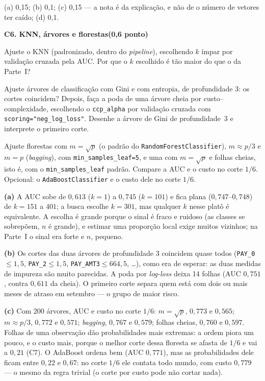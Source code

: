 \documentclass[11pt,a4paper]{article}
\newcommand{\tarefa}[3]{%
  \bigskip\par\noindent
  {\large\bfseries\color{azulufrj}#1. #2}\hfill{\bfseries(#3)}\par
  \nopagebreak\vspace{0.3em}}
\newcommand{\cod}[1]{\texttt{#1}}
\begin{document}
\begin{criterio}
(a) 0,15; (b) 0,1; (c) 0,15 --- a nota é da explicação, e não de o número de vetores
ter caído; (d) 0,1.
\end{criterio}

\tarefa{C6}{KNN, árvores e florestas}{0,6 ponto}

\begin{itens}
  \item Ajuste o KNN (padronizado, dentro do \emph{pipeline}), escolhendo $k$ ímpar por
        validação cruzada pela AUC. Por que o $k$ escolhido é tão maior do que o da
        Parte~I?
  \item Ajuste árvores de classificação com Gini e com entropia, de profundidade 3:
        os cortes coincidem? Depois, faça a poda de uma árvore cheia por
        custo--complexidade, escolhendo o \cod{ccp\_alpha} por validação cruzada com
        \cod{scoring="neg\_log\_loss"}. Desenhe a árvore de Gini de profundidade~3 e
        interprete o primeiro corte.
  \item Ajuste florestas com $m=\sqrt p$ (o padrão do \cod{RandomForestClassifier}),
        $m\approx p/3$ e $m=p$ (\emph{bagging}), com \cod{min\_samples\_leaf=5}, e uma
        com $m=\sqrt p$ e folhas cheias, isto é, com o \cod{min\_samples\_leaf} padrão.
        Compare a AUC e o custo no corte $1/6$. Opcional: o \cod{AdaBoostClassifier} e o custo dele no
        corte $1/6$.
\end{itens}

\begin{solucao}
\textbf{(a)} A AUC sobe de $0{,}613$ ($k=1$) a $0{,}745$ ($k=101$) e fica plana
($0{,}747$--$0{,}748$) de $k=151$ a $401$; a busca escolhe $k=301$, mas qualquer $k$
nesse platô é equivalente. A escolha é
grande porque o sinal é fraco e ruidoso (as classes se sobrepõem, $n$ é grande), e
estimar uma proporção local exige muitos vizinhos; na Parte~I o sinal era forte e
$n$, pequeno.

\textbf{(b)} Os cortes das duas árvores de profundidade 3 coincidem quase todos
(\cod{PAY\_0}$\le1{,}5$, \cod{PAY\_2}$\le1{,}5$, \cod{PAY\_AMT3}$\le664{,}5$, \dots), como era
de esperar: as duas medidas de impureza são muito parecidas. A poda por \emph{log-loss} deixa 14 folhas (AUC $0{,}751$, contra
$0{,}611$ da cheia). O primeiro corte separa quem está com dois ou mais meses de atraso
em setembro --- o grupo de maior risco.

\textbf{(c)} Com 200 árvores, AUC e custo no corte $1/6$: $m=\sqrt p$, $0{,}773$ e
$0{,}565$; $m\approx p/3$, $0{,}772$ e $0{,}571$; \emph{bagging}, $0{,}767$ e $0{,}579$;
folhas cheias, $0{,}760$ e $0{,}597$. Folhas de uma observação dão probabilidades mais
extremas: a ordem piora um pouco, e o custo mais, porque o melhor corte dessa floresta
se afasta de $1/6$ e vai a $0{,}21$ (C7). O AdaBoost ordena
bem (AUC $0{,}771$), mas as probabilidades dele ficam entre $0{,}22$ e $0{,}67$: no corte
$1/6$ ele contata todo mundo, com custo $0{,}779$ --- o mesmo da regra trivial (o corte
por custo pode não cortar nada).
\end{solucao}
\end{document}
